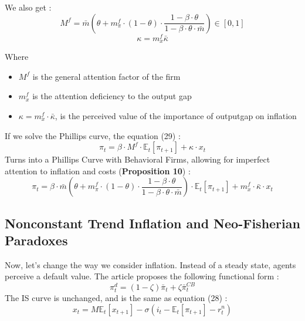 \documentclass{beamer}
\begin{document}
\begin{frame}{\subsecname}
    We also get : 
    \begin{equation*}
        M^{f}=\bar{m}\left(\theta+m^{f}_{\pi}\cdot(1-\theta)\cdot\frac{1-\beta\cdot\theta}{1-\beta\cdot\theta\cdot\bar{m}}\right)\in\left[0,1\right]
    \end{equation*}
    \begin{equation}\tag{58}
        \kappa = m^{f}_{x}\bar{\kappa}
    \end{equation}

    Where 
    \begin{itemize}
        \item $M^{f}$ is the general attention factor of the firm
        \item $m^{f}_{x}$ is the attention deficiency to the output gap
        \item $\kappa=m_{x}^{f}\cdot\bar{\kappa}$, is the perceived value of the importance of outputgap on inflation
    \end{itemize}
\end{frame}

\begin{frame}{\subsecname}
    If we solve the Phillips curve, the equation (29) : 
    \begin{equation}\tag{29}
        \pi_{t}=\beta\cdot M^{f}\cdot\mathbb{E}_{t}\left[\pi_{t+1}\right]+\kappa\cdot x_{t}
    \end{equation}
    Turns into a Phillips Curve with Behavioral Firms, allowing for imperfect attention to inflation and costs (\textbf{Proposition 10}) :
    \begin{equation*}
        \pi_{t}=\beta\cdot\bar{m}\left(\theta+m^{f}_{\pi}\cdot(1-\theta)\cdot\frac{1-\beta\cdot\theta}{1-\beta\cdot\theta\cdot\bar{m}}\right)\cdot\mathbb{E}_{t}\left[\pi_{t+1}\right]+m_{x}^{f}\cdot\bar{\kappa}\cdot x_{t}
    \end{equation*}
\end{frame}

\subsection{Nonconstant Trend Inflation and Neo-Fisherian Paradoxes}
\begin{frame}{\subsecname}
    Now, let's change the way we consider inflation. Instead of a steady state, agents perceive a default value.
    The article proposes the following functional form :
    \begin{equation}\tag{59}
        \pi^{d}_{t}=(1-\zeta)\bar{\pi}_{t}+\zeta\bar{\pi}_{t}^{CB}
    \end{equation}
    The IS curve is unchanged, and is the same as equation (28) :
    \begin{equation}\tag{60}
        x_{t}=M\mathbb{E}_{t}\left[x_{t+1}\right]-\sigma\left(i_{t}-\mathbb{E}_{t}\left[\pi_{t+1}\right]-r^{n}_{t}\right)
    \end{equation}
\end{frame}
\end{document}
